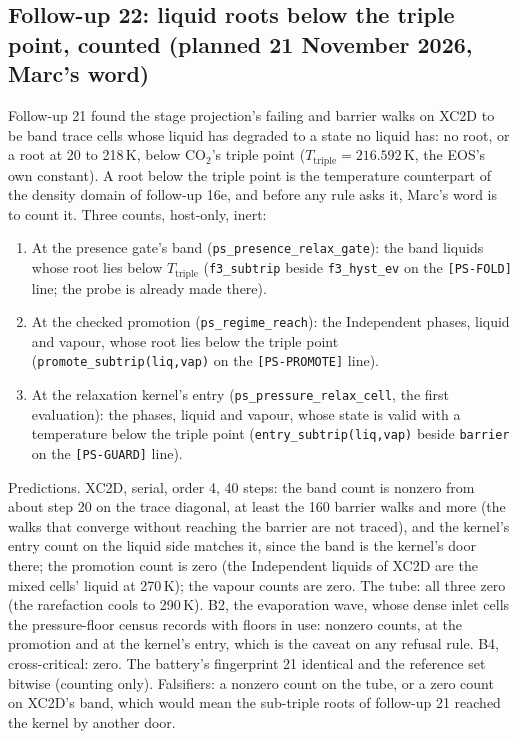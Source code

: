 \documentclass[11pt,a4paper]{article}
\newcommand{\code}[1]{\texttt{\small #1}}
\begin{document}
\subsection*{Follow-up 22: liquid roots below the triple point, counted (planned 21 November 2026, Marc's word)}

Follow-up 21 found the stage projection's failing and barrier walks on
XC2D to be band trace cells whose liquid has degraded to a state no
liquid has: no root, or a root at 20 to 218\,K, below CO$_2$'s triple
point ($T_{\mathrm{triple}} = 216.592$\,K, the EOS's own constant).  A
root below the triple point is the temperature counterpart of the
density domain of follow-up 16e, and before any rule asks it, Marc's
word is to count it.  Three counts, host-only, inert:
\begin{enumerate}[nosep]
\item At the presence gate's band (\code{ps\_presence\_relax\_gate}):
      the band liquids whose root lies below $T_{\mathrm{triple}}$
      (\code{f3\_subtrip} beside \code{f3\_hyst\_ev} on the
      \code{[PS-FOLD]} line; the probe is already made there).
\item At the checked promotion (\code{ps\_regime\_reach}): the
      Independent phases, liquid and vapour, whose root lies below the
      triple point (\code{promote\_subtrip(liq,vap)} on the
      \code{[PS-PROMOTE]} line).
\item At the relaxation kernel's entry (\code{ps\_pressure\_relax\_cell},
      the first evaluation): the phases, liquid and vapour, whose state
      is valid with a temperature below the triple point
      (\code{entry\_subtrip(liq,vap)} beside \code{barrier} on the
      \code{[PS-GUARD]} line).
\end{enumerate}
Predictions.  XC2D, serial, order 4, 40 steps: the band count is
nonzero from about step 20 on the trace diagonal, at least the 160
barrier walks and more (the walks that converge without reaching the
barrier are not traced), and the kernel's entry count on the liquid
side matches it, since the band is the kernel's door there; the
promotion count is zero (the Independent liquids of XC2D are the mixed
cells' liquid at 270\,K); the vapour counts are zero.  The tube: all
three zero (the rarefaction cools to 290\,K).  B2, the evaporation wave,
whose dense inlet cells the pressure-floor census records with floors
in use: nonzero counts, at the promotion and at the kernel's entry,
which is the caveat on any refusal rule.  B4, cross-critical: zero.
The battery's fingerprint 21 identical and the reference set bitwise
(counting only).  Falsifiers: a nonzero count on the tube, or a zero
count on XC2D's band, which would mean the sub-triple roots of
follow-up 21 reached the kernel by another door.
\end{document}
